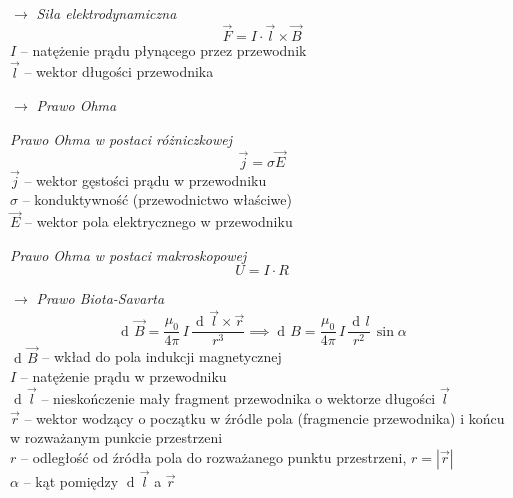 \documentclass[12pt]{article}
\newenvironment{wzor}[1]{\par{\Large $\longrightarrow$ \textit{#1}}}
    {\newline {\color{grey} \rule{\linewidth}{0.3pt}}}
\DeclareMathOperator{\der}{\operatorname{d}\!}
\begin{document}
\begin{wzor}{Siła elektrodynamiczna}
    \begin{equation}
        \Vec{F} = I \cdot \Vec{l} \times \Vec{B}
    \end{equation}
    $I$ -- natężenie prądu płynącego przez przewodnik\\
    $\Vec{l}$ -- wektor długości przewodnika
\end{wzor}

\newpage

\begin{wzor}{Prawo Ohma}
    \par \textit{Prawo Ohma w postaci różniczkowej}
    \begin{equation}
        \Vec{j} = \sigma \Vec{E}
    \end{equation}
    $\Vec{j}$ -- wektor gęstości prądu w przewodniku\\
    $\sigma$ -- konduktywność (przewodnictwo właściwe)\\
    $\Vec{E}$ -- wektor pola elektrycznego w przewodniku
    \par \textit{Prawo Ohma w postaci makroskopowej}
    \begin{equation}
        U = I \cdot R
    \end{equation}
\end{wzor}

\begin{wzor}{Prawo Biota-Savarta}
    \begin{equation}
        \der\Vec{B} = \frac{\mu_0}{4\pi} \, I \, \frac{\der\Vec{l}\times \Vec{r}}{r^3} \implies
        \der B = \frac{\mu_0}{4\pi} \, I \, \frac{\der l}{r^2} \, \sin \alpha
    \end{equation}
    $\der\Vec{B}$ -- wkład do pola indukcji magnetycznej\\
    $I$ -- natężenie prądu w przewodniku\\
    $\der\Vec{l}$ -- nieskończenie mały fragment przewodnika o wektorze długości $\Vec{l}$\\
    $\Vec{r}$ -- wektor wodzący o początku w źródle pola (fragmencie przewodnika)
        i końcu w rozważanym punkcie przestrzeni\\
    $r$ -- odległość od źródła pola do rozważanego punktu przestrzeni, $r = |\Vec{r}|$\\
    $\alpha$ -- kąt pomiędzy $\der\Vec{l}$ a $\Vec{r}$
\end{wzor}
\end{document}
